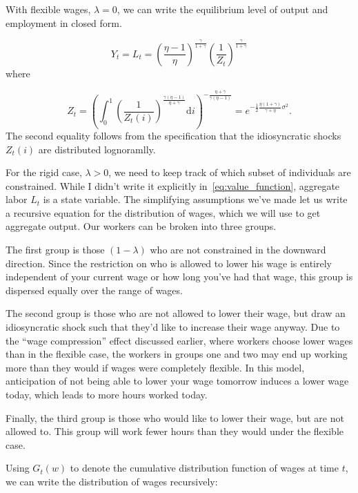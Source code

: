 \documentclass[12pt,a4paper]{scrartcl}            %
\begin{document}
With flexible wages, $\lambda = 0$, we can write the equilibrium level of output and employment in closed form.

\begin{equation}
    \label{eq:output_flexible}
    Y_t = L_t = \left( \frac{\eta - 1}{\eta} \right)^{\frac{\gamma}{1 + \gamma}} \left( \frac{1}{Z_t} \right)^{\frac{\gamma}{1 + \gamma}}
\end{equation}
%
where

\begin{equation}
    Z_t = \left( \int_{0}^{1}\! \left( \frac{1}{Z_t(i)} \right)^{\frac{\gamma(\eta - 1)}{\eta + \gamma}} \mathrm{d}i \right)^{-\frac{\eta + \gamma}{\gamma(\eta - 1)}} \!\!\! = e^{-\frac{1}{2} \frac{\eta(1 + \gamma)}{\gamma + \eta}\sigma^2 }.
\end{equation}
%
The second equality follows from the specification that the idiosyncratic shocks $Z_t(i)$ are distributed lognoramlly.

For the rigid case, $\lambda > 0$, we need to keep track of which subset of individuals are constrained.
While I didn't write it explicitly in~\eqref{eq:value_function}, aggregate labor $L_t$ is a state variable.
The simplifying assumptions we've made let us write a recursive equation for the distribution of wages, which we will use to get aggregate output.
Our workers can be broken into three groups.

The first group is those $(1 - \lambda)$ who are not constrained in the downward direction.
Since the restriction on who is allowed to lower his wage is entirely independent of your current wage or how long you've had that wage, this group is dispersed equally over the range of wages.

The second group is those who are not allowed to lower their wage, but draw an idiosyncratic shock such that they'd like to increase their wage anyway.
Due to the ``wage compression'' effect discussed earlier, where workers choose lower wages than in the flexible case, the workers in groups one and two may end up working more than they would if wages were completely flexible.
In this model, anticipation of not being able to lower your wage tomorrow induces a lower wage today, which leads to more hours worked today.

Finally, the third group is those who would like to lower their wage, but are not allowed to.
This group will work fewer hours than they would under the flexible case.

Using $G_t(w)$ to denote the cumulative distribution function of wages at time $t$, we can write the distribution of wages recursively:
\end{document}
